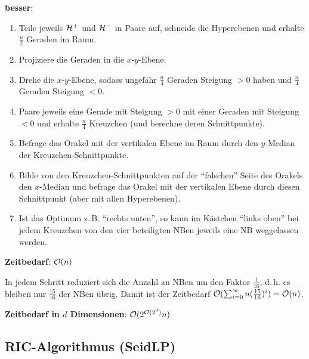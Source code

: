 \textbf{besser}:
\begin{enumerate}
    \item
    Teile jeweils $\mathcal{H}^+$ und $\mathcal{H}^-$ in Paare auf, schneide die Hyperebenen und erhalte
    $\frac{n}{2}$ Geraden im Raum.
    
    \item
    Projiziere die Geraden in die $x$-$y$-Ebene.
    
    \item
    Drehe die $x$-$y$-Ebene, sodass ungefähr $\frac{n}{4}$ Geraden Steigung $> 0$ haben und
    $\frac{n}{4}$ Geraden Steigung $< 0$.
    
    \item
    Paare jeweils eine Gerade mit Steigung $> 0$ mit einer Geraden mit Steigung $< 0$
    und erhalte $\frac{n}{4}$ Kreuzchen
    (und berechne deren Schnittpunkte).
    
    \item
    Befrage das Orakel mit der vertikalen Ebene im Raum durch den $y$-Median der
    Kreuzchen-Schnittpunkte.
    
    \item
    Bilde von den Kreuzchen-Schnittpunkten auf der "`falschen"' Seite des Orakels den $x$-Median
    und befrage das Orakel mit der vertikalen Ebene durch diesen Schnittpunkt
    (aber mit allen Hyperebenen).
    
    \item
    Ist das Optimum z.\,B. "`rechts unten"', so kann im Kästchen "`links oben"' bei jedem
    Kreuzchen von den vier beteiligten NBen jeweils eine NB weggelassen werden.
\end{enumerate}

\textbf{Zeitbedarf}:
$\mathcal{O}(n)$

\begin{Beweis}
    In jedem Schritt reduziert sich die Anzahl an NBen um den Faktor $\frac{1}{16}$,
    d.\,h. es bleiben nur $\frac{15}{16}$ der NBen übrig.
    Damit ist der Zeitbedarf $\mathcal{O}(\sum_{i=0}^\infty n(\frac{15}{16})^i) = \mathcal{O}(n)$.
\end{Beweis}

\textbf{Zeitbedarf in $d$ Dimensionen}:
$\mathcal{O}(2^{\mathcal{O}(2^d)} n)$

\pagebreak

\subsection{%
    RIC-Algorithmus (SeidLP)%
}

